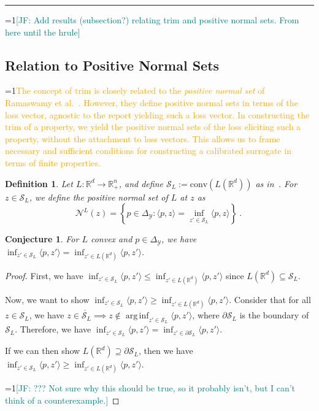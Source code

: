 \documentclass[12pt]{article}
\newcommand{\Comments}{1}
\newcommand{\mynote}[2]{\ifnum\Comments=1\textcolor{#1}{#2}\fi}
\newcommand{\jessie}[1]{\mynote{teal}{[JF: #1]}}
\newcommand{\proposedadd}[1]{\mynote{orange}{#1}}
\newcommand{\reals}{\mathbb{R}}
\newcommand{\simplex}{\Delta_\Y}
\newcommand{\N}{\mathcal{N}}
\newcommand{\Sc}{\mathcal{S}}
\newcommand{\Y}{\mathcal{Y}}
\newcommand{\inprod}[2]{\langle #1, #2 \rangle}%
\newcommand{\inter}[1]{\mathring{#1}}%
\newcommand{\trim}{\mathrm{trim}}
\newcommand{\conv}{\mathrm{conv}}
\DeclareMathOperator*{\arginf}{arg\,inf}
\newtheorem{conjecture}{Conjecture}
\newtheorem{definition}{Definition}
\begin{document}
\hrule
\bigskip
\jessie{Add results (subsection?) relating trim and positive normal sets.  From here until the hrule}
\subsection{Relation to Positive Normal Sets}

\proposedadd{The concept of $\trim$ is closely related to the \emph{positive normal set} of Ramaswamy et al.~\cite{ramaswamy2016convex}.
However, they define positive normal sets in terms of the loss vector, agnostic to the report yielding such a loss vector.
In constructing the $\trim$ of a property, we yield the positive normal sets of the loss eliciting such a property, without the attachment to loss vectors.
This allows us to frame necessary and sufficient conditions for constructing a calibrated surrogate in terms of finite properties.}


\begin{definition}
	Let $L:\reals^d \to \reals^n_+$, and define $\Sc_L := \conv(L(\reals^d))$ as in~\cite[Definition 8]{ramaswamy2016convex}.
	For $z \in \Sc_L$, we define the \emph{positive normal set} of $L$ at $z$ as
	\begin{equation}
	\N^L(z) = \left\{ p \in \simplex: \inprod{p}{z} = \inf_{z' \in \Sc_L} \inprod{p}{z} \right\}~.~
	\end{equation}
\end{definition}

\begin{conjecture}
	For $L$ convex and $p \in \simplex$, we have $\inf_{z' \in \Sc_L} \inprod{p}{z'} = \inf_{z' \in L(\reals^d)}\inprod{p}{z'}$.
\end{conjecture}
\begin{proof}
	First, we have $\inf_{z' \in \Sc_L} \inprod{p}{z'} \leq \inf_{z' \in L(\reals^d)}\inprod{p}{z'}$ since $L(\reals^d) \subseteq \Sc_L$.
	
	Now, we want to show $\inf_{z' \in \Sc_L} \inprod{p}{z'} \geq \inf_{z' \in L(\reals^d)}\inprod{p}{z'}$.
	Consider that for all $z \in \Sc_L$, we have $z \in \inter{\Sc_L} \implies z \not \in \arginf_{z' \in \Sc_L}\inprod{p}{z'}$, where $\partial \Sc_L$ is the boundary of $\Sc_L$.
	Therefore, we have $\inf_{z' \in \Sc_L}\inprod{p}{z'} = \inf_{z' \in \partial\Sc_L}\inprod{p}{z'}$.
	
	If we can then show $L(\reals^d) \supseteq \partial \Sc_L$, then we have $\inf_{z' \in \Sc_L} \inprod{p}{z'} \geq \inf_{z' \in L(\reals^d)}\inprod{p}{z'}$.

	\jessie{??? Not sure why this should be true, so it probably isn't, but I can't think of a counterexample.}
\end{proof}
\end{document}
